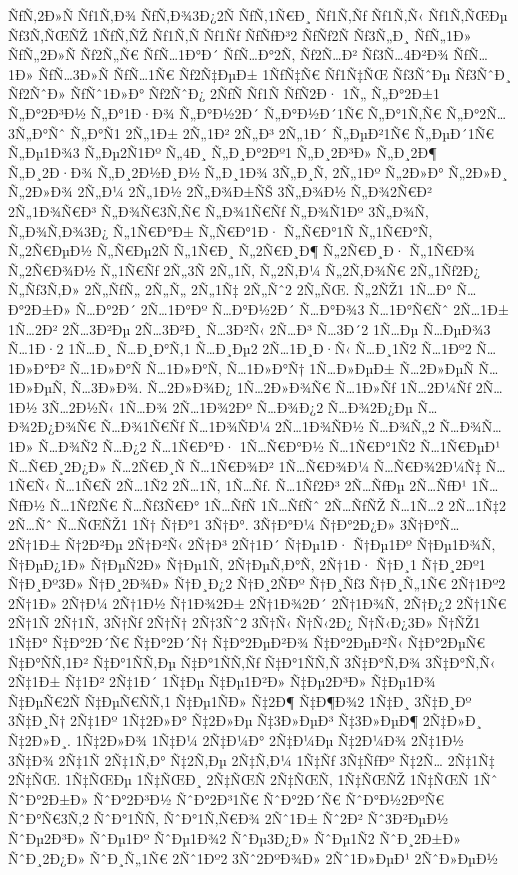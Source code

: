 {ÑƒÑ‚2Ð»Ñ
Ñƒ1Ñ‚Ð¾
ÑƒÑ‚Ð¾3Ð¿2Ñ
ÑƒÑ‚1Ñ€Ð¸
Ñƒ1Ñ‚Ñƒ
Ñƒ1Ñ‚Ñ‹
Ñƒ1Ñ‚ÑŒÐµ
Ñƒ3Ñ‚ÑŒÑŽ
1ÑƒÑ‚ÑŽ
Ñƒ1Ñ‚Ñ
Ñƒ1Ñƒ
ÑƒÑƒÐ³2
ÑƒÑƒ2Ñ
Ñƒ3Ñ„Ð¸
ÑƒÑ„1Ð»
ÑƒÑ„2Ð»Ñ
Ñƒ2Ñ„Ñ€
ÑƒÑ…1Ð°Ð´
ÑƒÑ…Ð°2Ñ‚
Ñƒ2Ñ…Ð²
Ñƒ3Ñ…4Ð²Ð¾
ÑƒÑ…1Ð»
ÑƒÑ…3Ð»Ñ
ÑƒÑ…1Ñ€
Ñƒ2Ñ‡ÐµÐ±
1ÑƒÑ‡Ñ€
Ñƒ1Ñ‡ÑŒ
Ñƒ3ÑˆÐµ
Ñƒ3ÑˆÐ¸
Ñƒ2ÑˆÐ»
ÑƒÑˆ1Ð»Ð°
Ñƒ2ÑˆÐ¿
2ÑƒÑ
Ñƒ1Ñ
ÑƒÑ2Ð·
1Ñ„
Ñ„Ð°2Ð±1
Ñ„Ð°2Ð³Ð½
Ñ„Ð°1Ð·Ð¾
Ñ„Ð°Ð½2Ð´
Ñ„Ð°Ð½Ð´1Ñ€
Ñ„Ð°1Ñ‚Ñ€
Ñ„Ð°2Ñ…
3Ñ„Ð°Ñˆ
Ñ„Ð°Ñ1
2Ñ„1Ð±
2Ñ„1Ð²
2Ñ„Ð³
2Ñ„1Ð´
Ñ„ÐµÐ²1Ñ€
Ñ„ÐµÐ´1Ñ€
Ñ„Ðµ1Ð¾3
Ñ„Ðµ2Ñ1Ðº
Ñ„4Ð¸
Ñ„Ð¸Ð°2Ðº1
Ñ„Ð¸2Ð³Ð»
Ñ„Ð¸2Ð¶
Ñ„Ð¸2Ð·Ð¾
Ñ„Ð¸2Ð½Ð¸Ð½
Ñ„Ð¸1Ð¾
3Ñ„Ð¸Ñ‚
2Ñ„1Ðº
Ñ„2Ð»Ð°
Ñ„2Ð»Ð¸
Ñ„2Ð»Ð¾
2Ñ„Ð¼
2Ñ„1Ð½
2Ñ„Ð¾Ð±ÑŠ
3Ñ„Ð¾Ð½
Ñ„Ð¾2Ñ€Ð²
2Ñ„1Ð¾Ñ€Ð³
Ñ„Ð¾Ñ€3Ñ‚Ñ€
Ñ„Ð¾1Ñ€Ñƒ
Ñ„Ð¾Ñ1Ðº
3Ñ„Ð¾Ñ‚
Ñ„Ð¾Ñ‚Ð¾3Ð¿
Ñ„1Ñ€Ð°Ð±
Ñ„Ñ€Ð°1Ð·
Ñ„Ñ€Ð°1Ñ
Ñ„1Ñ€Ð°Ñ‚
Ñ„2Ñ€ÐµÐ½
Ñ„Ñ€Ðµ2Ñ
Ñ„1Ñ€Ð¸
Ñ„2Ñ€Ð¸Ð¶
Ñ„2Ñ€Ð¸Ð·
Ñ„1Ñ€Ð¾
Ñ„2Ñ€Ð¾Ð½
Ñ„1Ñ€Ñƒ
2Ñ„3Ñ
2Ñ„1Ñ‚
Ñ„2Ñ‚Ð¼
Ñ„2Ñ‚Ð¾Ñ€
2Ñ„1Ñƒ2Ð¿
Ñ„Ñƒ3Ñ‚Ð»
2Ñ„ÑƒÑ„
2Ñ„Ñ„
2Ñ„1Ñ‡
2Ñ„Ñˆ2
2Ñ„ÑŒ.
Ñ„2ÑŽ1
1Ñ…Ð°
Ñ…Ð°2Ð±Ð»
Ñ…Ð°2Ð´
2Ñ…1Ð°Ðº
Ñ…Ð°Ð½2Ð´
Ñ…Ð°Ð¾3
Ñ…1Ð°Ñ€Ñˆ
2Ñ…1Ð±
1Ñ…2Ð²
2Ñ…3Ð²Ðµ
2Ñ…3Ð²Ð¸
Ñ…3Ð²Ñ‹
2Ñ…Ð³
Ñ…3Ð´2
1Ñ…Ðµ
Ñ…ÐµÐ¾3
Ñ…1Ð·2
1Ñ…Ð¸
Ñ…Ð¸Ð°Ñ‚1
Ñ…Ð¸Ðµ2
2Ñ…1Ð¸Ð·Ñ‹
Ñ…Ð¸1Ñ2
Ñ…1Ðº2
Ñ…1Ð»Ð°Ð²
Ñ…1Ð»Ð°Ñ
Ñ…1Ð»Ð°Ñ‚
Ñ…1Ð»Ð°Ñ†
1Ñ…Ð»ÐµÐ±
Ñ…2Ð»ÐµÑ
Ñ…1Ð»ÐµÑ‚
Ñ…3Ð»Ð¾.
Ñ…2Ð»Ð¾Ð¿
1Ñ…2Ð»Ð¾Ñ€
Ñ…1Ð»Ñƒ
1Ñ…2Ð¼Ñƒ
2Ñ…1Ð½
3Ñ…2Ð½Ñ‹
1Ñ…Ð¾
2Ñ…1Ð¾2Ðº
Ñ…Ð¾Ð¿2
Ñ…Ð¾2Ð¿Ðµ
Ñ…Ð¾2Ð¿Ð¾Ñ€
Ñ…Ð¾1Ñ€Ñƒ
Ñ…1Ð¾ÑÐ¼
2Ñ…1Ð¾ÑÐ½
Ñ…Ð¾Ñ„2
Ñ…Ð¾Ñ…1Ð»
Ñ…Ð¾Ñ2
Ñ…Ð¿2
Ñ…1Ñ€Ð°Ð·
1Ñ…Ñ€Ð°Ð½
Ñ…1Ñ€Ð°1Ñ2
Ñ…1Ñ€ÐµÐ¹
Ñ…Ñ€Ð¸2Ð¿Ð»
Ñ…2Ñ€Ð¸Ñ
Ñ…1Ñ€Ð¾Ð²
1Ñ…Ñ€Ð¾Ð¼
Ñ…Ñ€Ð¾2Ð¼Ñ‡
Ñ…1Ñ€Ñ‹
Ñ…1Ñ€Ñ
2Ñ…1Ñ2
2Ñ…1Ñ‚
1Ñ…Ñƒ.
Ñ…1Ñƒ2Ð³
2Ñ…ÑƒÐµ
2Ñ…ÑƒÐ¹
1Ñ…ÑƒÐ½
Ñ…1Ñƒ2Ñ€
Ñ…Ñƒ3Ñ€Ð°
1Ñ…ÑƒÑ
1Ñ…ÑƒÑˆ
2Ñ…ÑƒÑŽ
Ñ…1Ñ…2
2Ñ…1Ñ‡2
2Ñ…Ñˆ
Ñ…ÑŒÑŽ1
1Ñ†
Ñ†Ð°1
3Ñ†Ð°.
3Ñ†Ð°Ð¼
Ñ†Ð°2Ð¿Ð»
3Ñ†Ð°Ñ…
2Ñ†1Ð±
Ñ†2Ð²Ðµ
2Ñ†Ð²Ñ‹
2Ñ†Ð³
2Ñ†1Ð´
Ñ†Ðµ1Ð·
Ñ†Ðµ1Ðº
Ñ†Ðµ1Ð¾Ñ‚
Ñ†ÐµÐ¿1Ð»
Ñ†ÐµÑ2Ð»
Ñ†Ðµ1Ñ‚
2Ñ†ÐµÑ‚Ð°Ñ‚
2Ñ†1Ð·
Ñ†Ð¸1
Ñ†Ð¸2Ðº1
Ñ†Ð¸Ðº3Ð»
Ñ†Ð¸2Ð¾Ð»
Ñ†Ð¸Ð¿2
Ñ†Ð¸2ÑÐº
Ñ†Ð¸Ñƒ3
Ñ†Ð¸Ñ„1Ñ€
2Ñ†1Ðº2
2Ñ†1Ð»
2Ñ†Ð¼
2Ñ†1Ð½
Ñ†1Ð¾2Ð±
2Ñ†1Ð¾2Ð´
2Ñ†1Ð¾Ñ‚
2Ñ†Ð¿2
2Ñ†1Ñ€
2Ñ†1Ñ
2Ñ†1Ñ‚
3Ñ†Ñƒ
2Ñ†Ñ†
2Ñ†3Ñˆ2
3Ñ†Ñ‹
Ñ†Ñ‹2Ð¿
Ñ†Ñ‹Ð¿3Ð»
Ñ†ÑŽ1
1Ñ‡Ð°
Ñ‡Ð°2Ð´Ñ€
Ñ‡Ð°2Ð´Ñ†
Ñ‡Ð°2ÐµÐ²Ð¾
Ñ‡Ð°2ÐµÐ²Ñ‹
Ñ‡Ð°2ÐµÑ€
Ñ‡Ð°ÑÑ‚1Ð²
Ñ‡Ð°1ÑÑ‚Ðµ
Ñ‡Ð°1ÑÑ‚Ñƒ
Ñ‡Ð°1ÑÑ‚Ñ
3Ñ‡Ð°Ñ‚Ð¾
3Ñ‡Ð°Ñ‚Ñ‹
2Ñ‡1Ð±
Ñ‡1Ð²
2Ñ‡1Ð´
1Ñ‡Ðµ
Ñ‡Ðµ1Ð²Ð»
Ñ‡Ðµ2Ð³Ð»
Ñ‡Ðµ1Ð¾
Ñ‡ÐµÑ€2Ñ
Ñ‡ÐµÑ€ÑÑ‚1
Ñ‡Ðµ1ÑÐ»
Ñ‡2Ð¶
Ñ‡Ð¶Ð¾2
1Ñ‡Ð¸
3Ñ‡Ð¸Ðº
3Ñ‡Ð¸Ñ†
2Ñ‡1Ðº
1Ñ‡2Ð»Ð°
Ñ‡2Ð»Ðµ
Ñ‡3Ð»ÐµÐ³
Ñ‡3Ð»ÐµÐ¶
2Ñ‡Ð»Ð¸
Ñ‡2Ð»Ð¸.
1Ñ‡2Ð»Ð¾
1Ñ‡Ð¼
2Ñ‡Ð¼Ð°
2Ñ‡Ð¼Ðµ
Ñ‡2Ð¼Ð¾
2Ñ‡1Ð½
3Ñ‡Ð¾
2Ñ‡1Ñ
2Ñ‡1Ñ‚Ð°
Ñ‡2Ñ‚Ðµ
2Ñ‡Ñ‚Ð¼
1Ñ‡Ñƒ
3Ñ‡ÑƒÐº
Ñ‡2Ñ…
2Ñ‡1Ñ‡
2Ñ‡ÑŒ.
1Ñ‡ÑŒÐµ
1Ñ‡ÑŒÐ¸
2Ñ‡ÑŒÑ
2Ñ‡ÑŒÑ‚
1Ñ‡ÑŒÑŽ
1Ñ‡ÑŒÑ
1Ñˆ
ÑˆÐ°2Ð±Ð»
ÑˆÐ°2Ð³Ð½
ÑˆÐ°2Ð³1Ñ€
ÑˆÐ°2Ð´Ñ€
ÑˆÐ°Ð½2ÐºÑ€
ÑˆÐ°Ñ€3Ñ‚2
ÑˆÐ°1ÑÑ‚
ÑˆÐ°1Ñ‚Ñ€Ð¾
2Ñˆ1Ð±
Ñˆ2Ð²
Ñˆ3Ð²ÐµÐ½
ÑˆÐµ2Ð³Ð»
ÑˆÐµ1Ðº
ÑˆÐµ1Ð¾2
ÑˆÐµ3Ð¿Ð»
ÑˆÐµ1Ñ2
ÑˆÐ¸2Ð±Ð»
ÑˆÐ¸2Ð¿Ð»
ÑˆÐ¸Ñ„1Ñ€
2Ñˆ1Ðº2
3Ñˆ2ÐºÐ¾Ð»
2Ñˆ1Ð»ÐµÐ¹
2ÑˆÐ»ÐµÐ½
}
